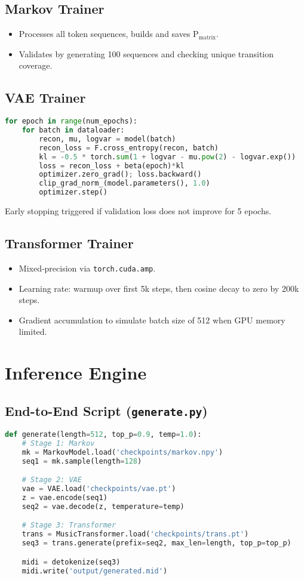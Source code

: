 \subsection{Markov Trainer}
\begin{itemize}
  \item Processes all token sequences, builds and saves $\text{P}_{\mathrm{matrix}}$.
  \item Validates by generating 100 sequences and checking unique transition coverage.
\end{itemize}

\subsection{VAE Trainer}
\begin{lstlisting}[language=Python]
for epoch in range(num_epochs):
    for batch in dataloader:
        recon, mu, logvar = model(batch)
        recon_loss = F.cross_entropy(recon, batch)
        kl = -0.5 * torch.sum(1 + logvar - mu.pow(2) - logvar.exp())
        loss = recon_loss + beta(epoch)*kl
        optimizer.zero_grad(); loss.backward()
        clip_grad_norm_(model.parameters(), 1.0)
        optimizer.step()
\end{lstlisting}
Early stopping triggered if validation loss does not improve for 5 epochs.

\subsection{Transformer Trainer}
\begin{itemize}
  \item Mixed‐precision via \texttt{torch.cuda.amp}.
  \item Learning rate: warmup over first 5k steps, then cosine decay to zero by 200k steps.
  \item Gradient accumulation to simulate batch size of 512 when GPU memory limited.
\end{itemize}

\newpage
\section{Inference Engine}

\subsection{End-to-End Script (\texttt{generate.py})}
\begin{lstlisting}[language=Python]
def generate(length=512, top_p=0.9, temp=1.0):
    # Stage 1: Markov
    mk = MarkovModel.load('checkpoints/markov.npy')
    seq1 = mk.sample(length=128)

    # Stage 2: VAE
    vae = VAE.load('checkpoints/vae.pt')
    z = vae.encode(seq1)
    seq2 = vae.decode(z, temperature=temp)

    # Stage 3: Transformer
    trans = MusicTransformer.load('checkpoints/trans.pt')
    seq3 = trans.generate(prefix=seq2, max_len=length, top_p=top_p)

    midi = detokenize(seq3)
    midi.write('output/generated.mid')
\end{lstlisting}

